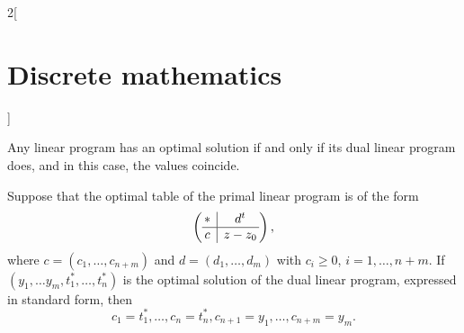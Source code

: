 \documentclass[class=article,10pt,crop=false]{standalone}
\begin{document}
\begin{multicols}{2}[\section{Discrete mathematics}]
\begin{theorem}
Any linear program has an optimal solution if and only if its dual linear program does, and in this case, the values coincide.
\end{theorem}
\begin{theorem}
Suppose that the optimal table of the primal linear program is of the form $$\left(\begin{array}{@{\,} c|c @{\,}}
    * & d^t\\
    \hline
    c & z-z_0\\
\end{array}\right),$$ where $c=(c_1,\ldots,c_{n+m})$ and $d=(d_1,\ldots,d_m)$ with $c_i\geq0$, $i=1,\ldots,n+m$. If $(y_1,\ldots y_m,t_1^*,\ldots,t_n^*)$ is the optimal solution of the dual linear program, expressed in standard form, then $$c_1=t_1^*,\ldots,c_n=t_n^*, c_{n+1}=y_1,\ldots,c_{n+m}=y_m.$$
\end{theorem}
\end{multicols}
\end{document}
